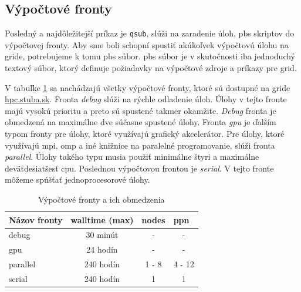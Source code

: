 \subsection{Výpočtové fronty}
Posledný a najdôležitejší príkaz je \texttt{qsub}, slúži na zaradenie úloh, \acrshort{pbs} skriptov do výpočtovej fronty.
Aby sme boli schopní spustiť akúkoľvek výpočtovú úlohu na gride, potrebujeme k tomu \acrfull{pbs} súbor.
\acrshort{pbs} súbor je v skutočnosti iba jednoduchý textový súbor, ktorý definuje požiadavky na výpočtové zdroje a príkazy pre grid.

V tabuľke \ref{tab:fronty} sa nachádzajú všetky výpočtové fronty, ktoré sú dostupné na gride \url{hpc.stuba.sk}.
Fronta \textit{debug} slúži na rýchle odladenie úloh. Úlohy v tejto fronte majú vysokú prioritu a preto sú spustené takmer okamžite.
\textit{Debug} fronta je obmedzená na maximálne dve súčasne spustené úlohy. Fronta \textit{gpu} je ďalším typom fronty pre úlohy, ktoré využívajú grafický akcelerátor.
Pre úlohy, ktoré využívajú \acrshort{mpi}, \acrshort{omp} a iné knižnice na paralelné programovanie, slúži fronta \textit{parallel}.
Úlohy takého typu musia použiť minimálne štyri a maximálne deväťdesiatšesť \acrshort{cpu}.
Poslednou výpočtovou frontou je \textit{serial}. V tejto fronte môžeme spúšťať jednoprocesorové úlohy. 

\begin{table}[!h]
\centering
\begin{tabular}{@{}lccc@{}}
\toprule
\textbf{Názov fronty} & \multicolumn{1}{l}{\textbf{walltime (max)}} & \multicolumn{1}{l}{\textbf{nodes}} & \multicolumn{1}{l}{\textbf{ppn}} \\ \midrule
debug                 & 30 minút                                    & -                                  & -                                      \\
gpu                   & 24 hodín                                    & -                                  & -                                      \\
parallel              & 240 hodín                                   & 1 - 8                              & 4 - 12                                 \\
serial                & 240 hodín                                   & 1                                  & 1                                      \\ \bottomrule
\end{tabular}
\caption{Výpočtové fronty a ich obmedzenia}
\label{tab:fronty}
\end{table}


